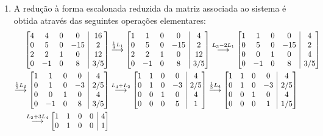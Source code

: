 \documentclass[12pt,a4paper]{article}
\makeatletter
\newenvironment{amatrix}[1]{%
  \left[\begin{array}{@{}*{#1}{c}|c@{}}
}{%
  \end{array}\right]
}
\newcommand{\grstep}[2][\relax]{%
   \ensuremath{\mathrel{
       {\mathop{\longrightarrow}\limits^{#2\mathstrut}_{
                                     \begin{subarray}{l} #1 \end{subarray}}}}}}
\makeatother
\begin{document}
\begin{enumerate}
\begin{enumerate}
\item A redução à forma escalonada reduzida da matriz associada ao sistema é obtida através das seguintes operações elementares:
\begin{align*}
\begin{amatrix}{4}
4 &  4 & 0 &   0 & 16 \\
0 &  5 & 0 & -15 & 2 \\
2 &  2 & 1 &   0 & 12 \\
0 & -1 & 0 &   8 & 3/5
\end{amatrix}
&
\grstep{ \frac{1}{4} L_1 }
\begin{amatrix}{4}
1 &  1 & 0 &   0 & 4 \\
0 &  5 & 0 & -15 & 2 \\
2 &  2 & 1 &   0 & 12 \\
0 & -1 & 0 &   8 & 3/5
\end{amatrix}
\grstep{ L_3 - 2 L_1 }
\begin{amatrix}{4}
1 &  1 & 0 &   0 & 4 \\
0 &  5 & 0 & -15 & 2 \\
0 &  0 & 1 &   0 & 4 \\
0 & -1 & 0 &   8 & 3/5
\end{amatrix} \\
\grstep{ \frac{1}{5} L_2 }
\begin{amatrix}{4}
1 &  1 & 0 &   0 & 4 \\
0 &  1 & 0 & -3 & 2/5 \\
0 &  0 & 1 &   0 & 4 \\
0 & -1 & 0 &   8 & 3/5
\end{amatrix}
&
\grstep{ L_4 + L_2 }
\begin{amatrix}{4}
1 & 1 & 0 &  0 & 4 \\
0 & 1 & 0 & -3 & 2/5 \\
0 & 0 & 1 &  0 & 4 \\
0 & 0 & 0 &  5 & 1
\end{amatrix}
\grstep{ \frac{1}{5} L_4 }
\begin{amatrix}{4}
1 & 1 & 0 &  0 & 4 \\
0 & 1 & 0 & -3 & 2/5 \\
0 & 0 & 1 &  0 & 4 \\
0 & 0 & 0 &  1 & 1/5
\end{amatrix} \\
\grstep{ L_2 + 3L_4 }
\begin{amatrix}{4}
1 & 1 & 0 & 0 & 4 \\
0 & 1 & 0 & 0 & 1 \\

\end{amatrix}
\end{align*}
\end{enumerate}
\end{enumerate}
\end{document}
